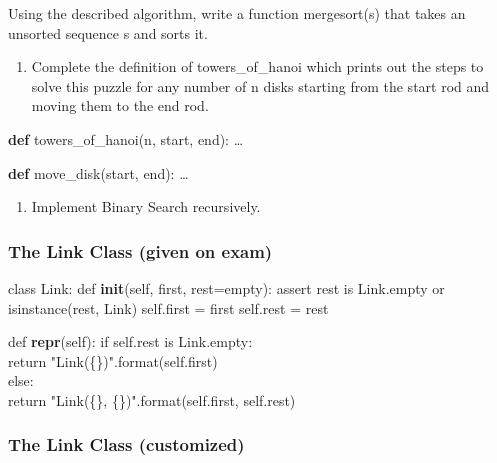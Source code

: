 \documentclass[11pt]{article}
\providecommand{\tightlist}{%
      \setlength{\itemsep}{0pt}\setlength{\parskip}{0pt}}
\newenvironment{Shaded}{}{}
\newcommand{\KeywordTok}[1]{\textcolor[rgb]{0.00,0.44,0.13}{\textbf{{#1}}}}
\newcommand{\NormalTok}[1]{{#1}}
\begin{document}
Using the described algorithm, write a function mergesort(s) that takes
an unsorted sequence s and sorts it.

\begin{enumerate}
\def\labelenumi{\arabic{enumi}.}
\setcounter{enumi}{5}
\tightlist
\item
  Complete the definition of towers\_of\_hanoi which prints out the
  steps to solve this puzzle for any number of n disks starting from the
  start rod and moving them to the end rod.
\end{enumerate}

\begin{Shaded}
\begin{Highlighting}[]
\KeywordTok{def}\NormalTok{ towers_of_hanoi(n, start, end):}
\NormalTok{    …}

\KeywordTok{def}\NormalTok{ move_disk(start, end):}
\NormalTok{    …}
\end{Highlighting}
\end{Shaded}

\begin{enumerate}
\def\labelenumi{\arabic{enumi}.}
\setcounter{enumi}{6}
\tightlist
\item
  Implement Binary Search recursively.
\end{enumerate}

    \subsubsection{The Link Class (given on
exam)}\label{the-link-class-given-on-exam}

class Link: def \textbf{init}(self, first, rest=empty): assert rest is
Link.empty or isinstance(rest, Link) self.first = first self.rest = rest

def \textbf{repr}(self): if self.rest is Link.empty:\\
return "Link(\{\})".format(self.first)\\
else:\\
return "Link(\{\}, \{\})".format(self.first, self.rest)

\subsubsection{The Link Class
(customized)}\label{the-link-class-customized}
\end{document}
